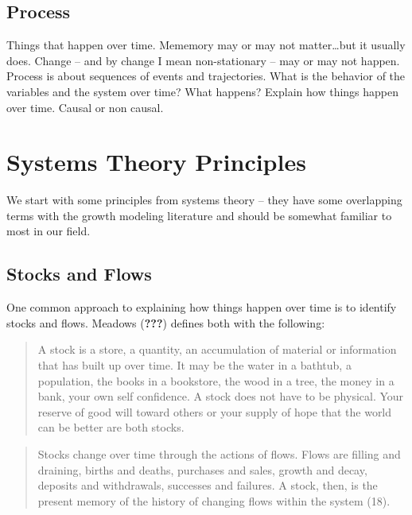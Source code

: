 \documentclass[english,,man]{apa6}
\theoremstyle{definition}
\theoremstyle{definition}
\theoremstyle{definition}
\theoremstyle{remark}
\begin{document}
\hypertarget{process}{%
\subsection{Process}\label{process}}

Things that happen over time. Mememory may or may not matter\ldots{}but
it usually does. Change -- and by change I mean non-stationary -- may or
may not happen. Process is about sequences of events and trajectories.
What is the behavior of the variables and the system over time? What
happens? Explain how things happen over time. Causal or non causal.

\hypertarget{systems-theory-principles}{%
\section{Systems Theory Principles}\label{systems-theory-principles}}

We start with some principles from systems theory -- they have some
overlapping terms with the growth modeling literature and should be
somewhat familiar to most in our field.

\hypertarget{stocks-and-flows}{%
\subsection{Stocks and Flows}\label{stocks-and-flows}}

One common approach to explaining how things happen over time is to
identify stocks and flows. Meadows ({\textbf{???}}) defines both with
the following:

\begin{quote}
A stock is a store, a quantity, an accumulation of material or
information that has built up over time. It may be the water in a
bathtub, a population, the books in a bookstore, the wood in a tree, the
money in a bank, your own self confidence. A stock does not have to be
physical. Your reserve of good will toward others or your supply of hope
that the world can be better are both stocks.
\end{quote}

\begin{quote}
Stocks change over time through the actions of flows. Flows are filling
and draining, births and deaths, purchases and sales, growth and decay,
deposits and withdrawals, successes and failures. A stock, then, is the
present memory of the history of changing flows within the system (18).
\end{quote}
\end{document}
